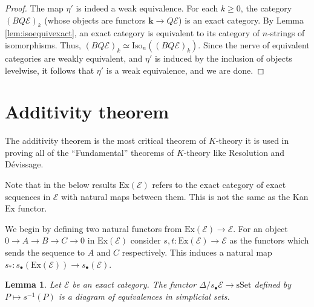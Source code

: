 \documentclass[12pt]{report}
\numberwithin{equation}{section}
\newtheorem{lemma}[dummy]{Lemma}
\begin{document}
\begin{proof}
		The map $\eta'$ is indeed a weak equivalence. For each $k \ge 0$, the category $(BQ\mathcal{E})_k$ (whose objects are functors $\mathbf{k} \to Q\mathcal{E}$) is an exact category. By Lemma \ref{lem:isoequivexact}, an exact category is equivalent to its category of $n$-strings of isomorphisms. Thus, $(BQ\mathcal{E})_k \simeq \mathrm{Iso}_n((BQ\mathcal{E})_k)$. Since the nerve of equivalent categories are weakly equivalent, and $\eta'$ is induced by the inclusion of objects levelwise, it follows that $\eta'$ is a weak equivalence, and we are done.
	\end{proof}
	
	\section{Additivity theorem}
	The additivity theorem is the most critical theorem of \( K \)-theory it is used in proving all of the ``Fundamental'' theorems of \( K \)-theory like Resolution and D\'evissage.
	
	Note that in the below results \( \mathrm{Ex}(\mathcal{E}) \) refers to the exact category of exact sequences in \( \mathcal{E} \) with natural maps between them. This is not the same as the Kan \( \mathrm{Ex} \) functor.
	
	We begin by defining two natural functors from \( \mathrm{Ex}(\mathcal{E}) \to \mathcal{E} \). For an object \( 0 \to A \to B \to C \to 0 \) in \( \mathrm{Ex}(\mathcal{E}) \) consider \( s,t: \mathrm{Ex}(\mathcal{E})  \to \mathcal{E}\) as the functors which sends the sequence to \( A \) and \( C\) respectively. This induces a natural map \( s_*: s_\bullet (\mathrm{Ex}(\mathcal{E})) \to s_\bullet (\mathcal{E}) \).
	

\begin{lemma}
	\label{lem-foradditivity}
	Let $\mathcal{E}$ be an exact category. The functor $\Delta/s_{\bullet}\mathcal{E} \to \mathrm{sSet}$ defined by $P \mapsto s^{-1}(P)$ is a diagram of equivalences in simplicial sets.
\end{lemma}
\end{document}
